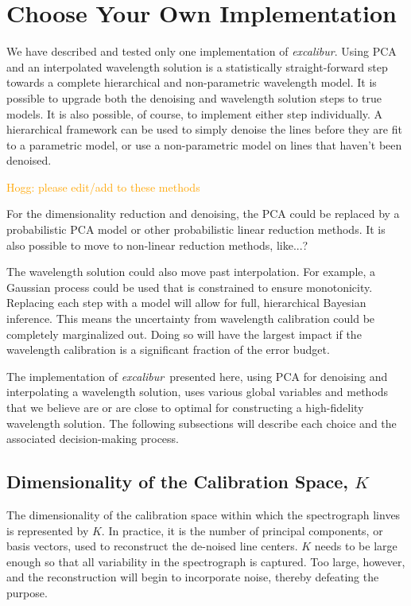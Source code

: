 \documentclass[modern]{aastex63}
\newcommand{\project}[1]{\textsl{#1}}
\newcommand{\name}{\project{excalibur}}
\newcommand{\lz}[1]{\textcolor{orange}{#1}}
\begin{document}
\section{Choose Your Own Implementation} \label{sec:choices}
We have described and tested only one implementation of \name.  Using PCA and an interpolated wavelength solution is a statistically straight-forward step towards a complete hierarchical and non-parametric wavelength model.  It is possible to upgrade both the denoising and wavelength solution steps to true models.  It is also possible, of course, to implement either step individually.  A hierarchical framework can be used to simply denoise the lines before they are fit to a parametric model, or use a non-parametric model on lines that haven't been denoised.

\lz{Hogg: please edit/add to these methods}

For the dimensionality reduction and denoising, the PCA could be replaced by a probabilistic PCA model or other probabilistic linear reduction methods.  It is also possible to move to non-linear reduction methods, like...?

The wavelength solution could also move past interpolation.  For example, a Gaussian process could be used that is constrained to ensure monotonicity.  Replacing each step with a model will allow for full, hierarchical Bayesian inference.  This means the uncertainty from wavelength calibration could be completely marginalized out.  Doing so will have the largest impact if the wavelength calibration is a significant fraction of the error budget.

The implementation of \name\ presented here, using PCA for denoising and interpolating a wavelength solution, uses various global variables and methods that we believe are or are close to optimal for constructing a high-fidelity wavelength solution.  The following subsections will describe each choice and the associated decision-making process.

\subsection{Dimensionality of the Calibration Space, $K$}
\label{sec:choice_k}
The dimensionality of the calibration space within which the spectrograph linves is represented by $K$.  In practice, it is the number of principal components, or basis vectors, used to reconstruct the de-noised line centers.  $K$ needs to be large enough so that all variability in the spectrograph is captured.  Too large, however, and the reconstruction will begin to incorporate noise, thereby defeating the purpose.
\end{document}
